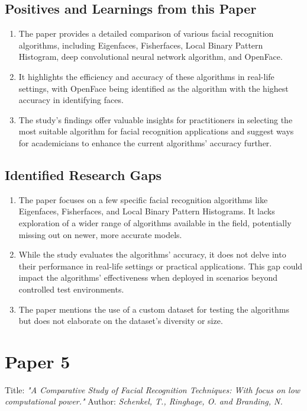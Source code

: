 \documentclass[openany]{report}
\begin{document}
\subsection{Positives and Learnings from this Paper}
\begin{enumerate}
    \item The paper provides a detailed comparison of various facial recognition algorithms, including Eigenfaces, Fisherfaces, Local Binary Pattern Histogram, deep convolutional neural network algorithm, and OpenFace.
    \item It highlights the efficiency and accuracy of these algorithms in real-life settings, with OpenFace being identified as the algorithm with the highest accuracy in identifying faces.
    \item The study's findings offer valuable insights for practitioners in selecting the most suitable algorithm for facial recognition applications and suggest ways for academicians to enhance the current algorithms' accuracy further.
\end{enumerate}
\subsection{Identified Research Gaps}
\begin{enumerate}
    \item The paper focuses on a few specific facial recognition algorithms like Eigenfaces, Fisherfaces, and Local Binary Pattern Histograms. It lacks exploration of a wider range of algorithms available in the field, potentially missing out on newer, more accurate models.

    \item While the study evaluates the algorithms' accuracy, it does not delve into their performance in real-life settings or practical applications. This gap could impact the algorithms' effectiveness when deployed in scenarios beyond controlled test environments.

    \item The paper mentions the use of a custom dataset for testing the algorithms but does not elaborate on the dataset's diversity or size.
\end{enumerate}

\section{Paper 5}

Title:  \textit{"A Comparative Study of Facial Recognition Techniques: With focus on low computational power."}
Author:  \textit{Schenkel, T., Ringhage, O. and Branding, N.} \cite{11}
\end{document}
